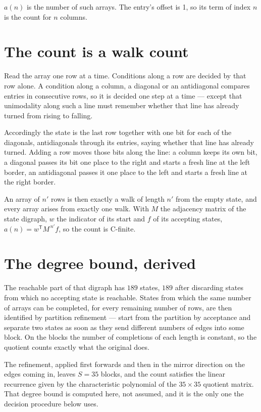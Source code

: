 \documentclass[11pt]{article}
\theoremstyle{definition}
\begin{document}
$a(n)$ is the number of such arrays. The entry's offset is 1, so its term of index $n$ is the count for $n$ columns.

\section{The count is a walk count}

Read the array one row at a time. Conditions along a row are decided by that row alone. A condition along a column, a diagonal or an antidiagonal compares entries in consecutive rows, so it is decided one step at a time --- except that unimodality along such a line must remember whether that line has already turned from rising to falling.

Accordingly the state is the last row together with one bit for each of the diagonals, antidiagonals through its entries, saying whether that line has already turned. Adding a row moves those bits along the line: a column keeps its own bit, a diagonal passes its bit one place to the right and starts a fresh line at the left border, an antidiagonal passes it one place to the left and starts a fresh line at the right border.

An array of $n'$ rows is then exactly a walk of length $n'$ from the empty state, and every array arises from exactly one walk. With $M$ the adjacency matrix of the state digraph, $w$ the indicator of its start and $f$ of its accepting states, $a(n) = w^{\mathsf T}M^{\,n'}f$, so the count is C-finite.

\section{The degree bound, derived}

The reachable part of that digraph has $189$ states, $189$ after discarding states from which no accepting state is reachable. States from which the same number of arrays can be completed, for every remaining number of rows, are then identified by partition refinement --- start from the partition by acceptance and separate two states as soon as they send different numbers of edges into some block. On the blocks the number of completions of each length is constant, so the quotient counts exactly what the original does.

The refinement, applied first forwards and then in the mirror direction on the edges coming in, leaves $S = 35$ blocks, and the count satisfies the linear recurrence given by the characteristic polynomial of the $35 \times 35$ quotient matrix. That degree bound is computed here, not assumed, and it is the only one the decision procedure below uses.
\end{document}
